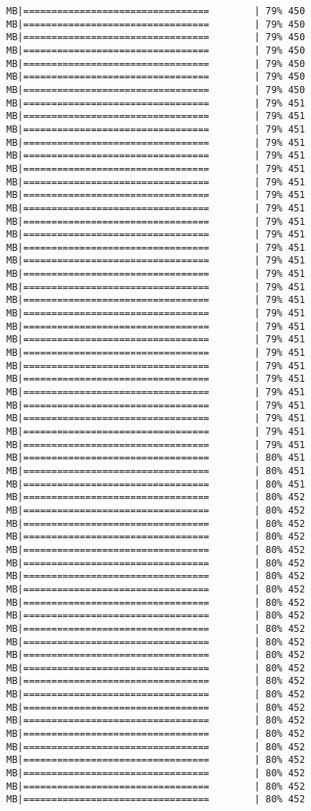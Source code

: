 \documentclass[
]{article}
\begin{document}
\begin{verbatim}
MB|=================================        | 79% 450 MB|=================================        | 79% 450 MB|=================================        | 79% 450 MB|=================================        | 79% 450 MB|=================================        | 79% 450 MB|=================================        | 79% 450 MB|=================================        | 79% 450 MB|=================================        | 79% 451 MB|=================================        | 79% 451 MB|=================================        | 79% 451 MB|=================================        | 79% 451 MB|=================================        | 79% 451 MB|=================================        | 79% 451 MB|=================================        | 79% 451 MB|=================================        | 79% 451 MB|=================================        | 79% 451 MB|=================================        | 79% 451 MB|=================================        | 79% 451 MB|=================================        | 79% 451 MB|=================================        | 79% 451 MB|=================================        | 79% 451 MB|=================================        | 79% 451 MB|=================================        | 79% 451 MB|=================================        | 79% 451 MB|=================================        | 79% 451 MB|=================================        | 79% 451 MB|=================================        | 79% 451 MB|=================================        | 79% 451 MB|=================================        | 79% 451 MB|=================================        | 79% 451 MB|=================================        | 79% 451 MB|=================================        | 79% 451 MB|=================================        | 79% 451 MB|=================================        | 79% 451 MB|=================================        | 80% 451 MB|=================================        | 80% 451 MB|=================================        | 80% 451 MB|=================================        | 80% 452 MB|=================================        | 80% 452 MB|=================================        | 80% 452 MB|=================================        | 80% 452 MB|=================================        | 80% 452 MB|=================================        | 80% 452 MB|=================================        | 80% 452 MB|=================================        | 80% 452 MB|=================================        | 80% 452 MB|=================================        | 80% 452 MB|=================================        | 80% 452 MB|=================================        | 80% 452 MB|=================================        | 80% 452 MB|=================================        | 80% 452 MB|=================================        | 80% 452 MB|=================================        | 80% 452 MB|=================================        | 80% 452 MB|=================================        | 80% 452 MB|=================================        | 80% 452 MB|=================================        | 80% 452 MB|=================================        | 80% 452 MB|=================================        | 80% 452 MB|=================================        | 80% 452 MB|=================================        | 80% 452 
\end{verbatim}
\end{document}
